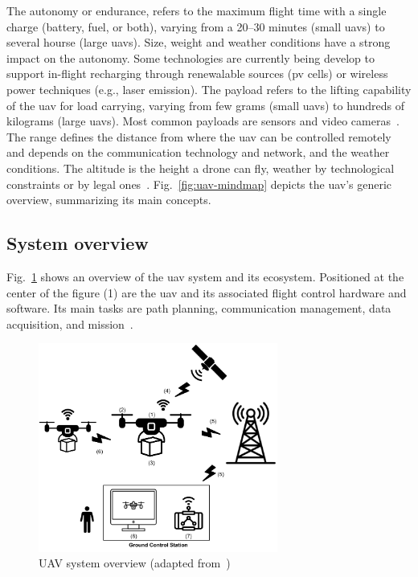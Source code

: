 The autonomy or endurance, refers to the maximum flight time with a
single charge (battery, fuel, or both), varying from a 20--30 minutes (small \glspl{uav}) to several
hourse (large \glspl{uav}). Size, weight and weather conditions have a strong
impact on the autonomy. Some technologies are currently being develop to support
in-flight recharging through renewalable sources (\gls{pv} cells) or wireless
power techniques (e.g., laser emission)\cite{mohsan2022towards}.
The payload refers to the lifting capability of the \gls{uav} for load carrying,
varying from few grams (small \glspl{uav}) to hundreds of kilograms (large
\glspl{uav}). Most common payloads are sensors and video cameras~\cite{mohsan2022towards}.
The range defines the distance from where the \gls{uav} can be controlled
remotely and depends on the communication technology and network, and the
weather conditions\cite{mohsan2022towards}. The altitude is the height a drone can fly, weather by
technological constraints or by legal ones~\cite{mohsan2022towards}.
%
Fig.~\ref{fig:uav-mindmap} depicts the \gls{uav}'s
generic overview, summarizing its main concepts.
%
%
\subsection{System overview}%
\label{sec:system-overview}
Fig.~\ref{fig:uav-sysOverv} shows an overview of the \gls{uav} system and its
ecosystem.
Positioned at the center of the figure (1) are the \gls{uav} and its associated flight control hardware and software.
Its main tasks are path planning, communication
management, data acquisition, and mission~\cite{aggarwal2020UAVPathPlanning}.

\begin{figure}[!hbt]
  \centering
  \includegraphics[width=0.7\textwidth]{./img/pdf/uav-sys-overv.pdf} 
%   
  \caption[UAV system overview]{UAV system overview (adapted from~\cite{mohsan2022towards,aggarwal2020UAVPathPlanning})}%
  \label{fig:uav-sysOverv}
\end{figure}

